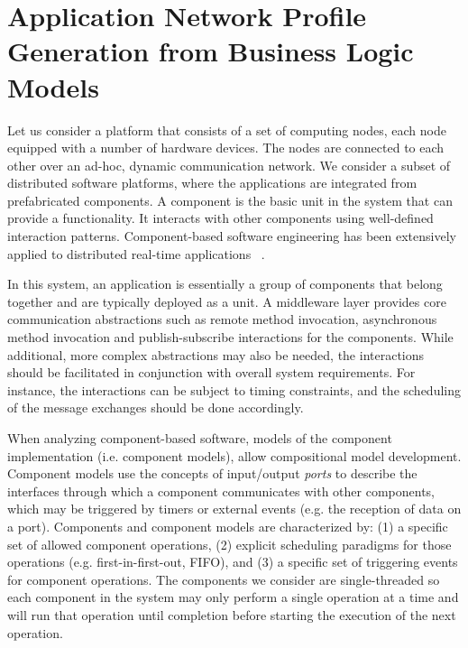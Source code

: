 \newpage

\section{Application Network Profile Generation from Business Logic Models}
\label{sec:generation}

Let us consider a platform that consists of a set of computing nodes, each node equipped with a number of hardware devices. The nodes are connected to each other over an ad-hoc, dynamic communication network.  We consider a subset of distributed software platforms, where the applications are integrated from prefabricated components. A component is the basic unit in the system that can provide a functionality. It interacts with other components using well-defined interaction patterns. Component-based software engineering has been extensively applied to distributed real-time applications ~\cite{Emb_SW_PECOS:02,RT_CIAO:04,PROGRESS_ICSEA:08,ACM_SPE:10,ISIS_F6_ISORC:13}.  

In this system, an application is essentially a group of components that belong together and are typically deployed as a unit. A middleware layer  provides core communication abstractions such as remote method invocation, asynchronous method invocation and publish-subscribe interactions for the components. While additional, more complex abstractions may also be needed, the interactions should be facilitated in conjunction with overall system requirements. For instance, the interactions can be subject to timing constraints, and the scheduling of the message exchanges should be done accordingly. 

When analyzing component-based software, models of the component implementation (i.e. component models), allow compositional model development.  Component models use the concepts of input/output \emph{ports} to describe the interfaces through which a component communicates with other components, which may be triggered by timers or external events (e.g. the reception of data on a port).  Components and component models are characterized by: (1) a specific set of allowed component operations, (2) explicit scheduling paradigms for those operations (e.g. first-in-first-out, FIFO), and (3) a specific set of triggering events for component operations.  The components we consider are single-threaded so each component in the system may only perform a single operation at a time and will run that operation until completion before starting the execution of the next operation.  

